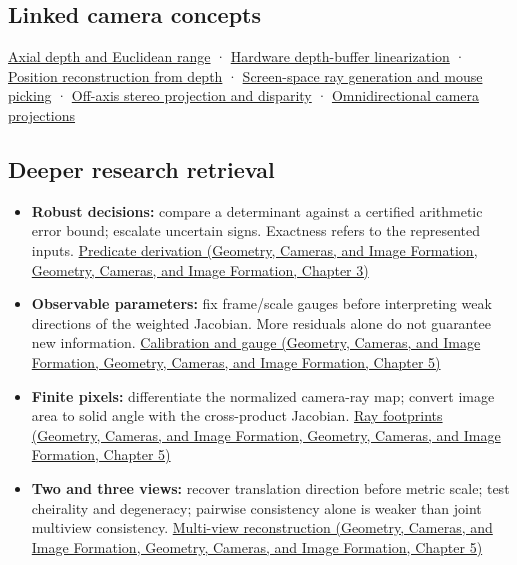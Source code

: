 \subsection{Linked camera concepts}\label{appendix-a2b71a18f5a2-linked-camera-concepts}

\hyperref[appendix-cac01ebeeb11]{Axial depth and Euclidean range} · \hyperref[appendix-1bc40b08db4a]{Hardware depth-buffer linearization} · \hyperref[appendix-2cbf2968e866]{Position reconstruction from depth} · \hyperref[appendix-f1a6d43e80d1]{Screen-space ray generation and mouse picking} · \hyperref[appendix-0976e86e5b9f]{Off-axis stereo projection and disparity} · \hyperref[appendix-fc99ad39f351]{Omnidirectional camera projections}

\subsection{Deeper research retrieval}\label{appendix-a2b71a18f5a2-deeper-research-retrieval}

\begin{itemize}
\tightlist
\item
  \textbf{Robust decisions:} compare a determinant against a certified arithmetic error bound; escalate uncertain signs. Exactness refers to the represented inputs. \href{../03-Geometry-Cameras-and-Image-Formation/main.pdf\#nameddest=02-foundations-ii-ch034-a-sign-can-matter-more-than-a-coordinate-robust-predicates}{Predicate derivation (Geometry, Cameras, and Image Formation, Geometry, Cameras, and Image Formation, Chapter 3)}
\item
  \textbf{Observable parameters:} fix frame/scale gauges before interpreting weak directions of the weighted Jacobian. More residuals alone do not guarantee new information. \href{../03-Geometry-Cameras-and-Image-Formation/main.pdf\#nameddest=02-foundations-ii-ch036-calibration-needs-informative-observations-and-a-fixed-gauge}{Calibration and gauge (Geometry, Cameras, and Image Formation, Geometry, Cameras, and Image Formation, Chapter 5)}
\item
  \textbf{Finite pixels:} differentiate the normalized camera-ray map; convert image area to solid angle with the cross-product Jacobian. \href{../03-Geometry-Cameras-and-Image-Formation/main.pdf\#nameddest=02-foundations-ii-ch036-a-camera-ray-carries-a-pixel-footprint}{Ray footprints (Geometry, Cameras, and Image Formation, Geometry, Cameras, and Image Formation, Chapter 5)}
\item
  \textbf{Two and three views:} recover translation direction before metric scale; test cheirality and degeneracy; pairwise consistency alone is weaker than joint multiview consistency. \href{../03-Geometry-Cameras-and-Image-Formation/main.pdf\#nameddest=02-foundations-ii-ch036-calibrated-two-view-geometry-direction-before-distance}{Multi-view reconstruction (Geometry, Cameras, and Image Formation, Geometry, Cameras, and Image Formation, Chapter 5)}
\end{itemize}

